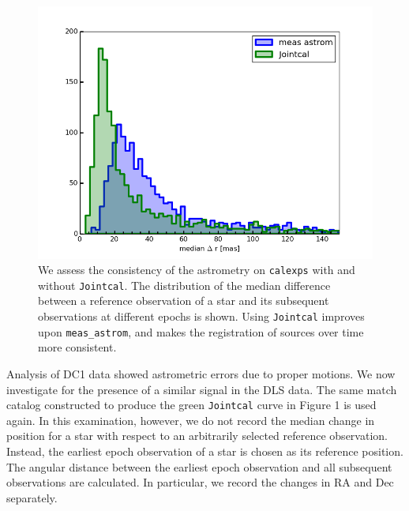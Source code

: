 \documentclass[DM,toc]{lsstdoc}
\begin{document}
\begin{figure}
   \includegraphics[width=.9\textwidth]{jc_vs_measastrom.png}
	\caption{We assess the consistency of the astrometry on {\tt\string calexps} with and without {\tt\string Jointcal}. The distribution of the median difference between a reference observation of a star and its subsequent observations at different epochs is shown. Using {\tt\string Jointcal} improves upon {\tt\string meas\_astrom}, and makes the registration of sources over time more consistent.}
\end{figure}

Analysis of DC1 data showed astrometric errors due to proper motions. We now investigate for the presence of a similar signal in the DLS data. The same match catalog constructed to produce the green {\tt\string Jointcal} curve in Figure 1 is used again. In this examination, however, we do not record the median change in position for a star with respect to an arbitrarily selected reference observation. Instead, the earliest epoch observation of a star is chosen as its reference position. The angular distance between the earliest epoch observation and all subsequent observations are calculated. In particular, we record the changes in RA and Dec separately.
\end{document}
